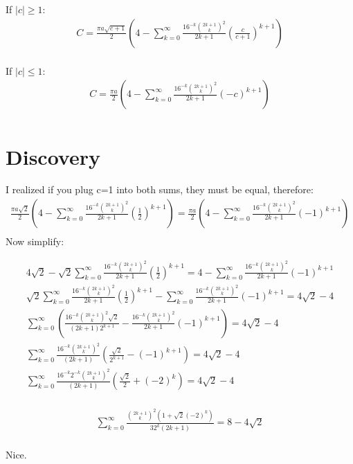 \documentclass{article}
\begin{document}
If $|c| \geq 1$:
\begin{equation*}
\begin{split}
	C = \frac{\pi a\sqrt{c+1}}{2} \left(4 -
	\sum_{k=0}^{\infty} \frac{16^{-k}{{2k+1}\choose k}^2}{2k+1}\left(\frac{c}{c+1}\right)^{k+1}\right)\\
\end{split}
\end{equation*}

If $|c| \leq 1$:
\begin{equation*}
\begin{split}
	C = \frac{\pi a}{2}\left(4-\sum_{k=0}^{\infty}\frac{16^{-k}{{2k+1}\choose k}^2}{2k+1}(-c)^{k+1}\right)\\
\end{split}
\end{equation*}

\section{Discovery}
I realized if you plug c=1 into both sums, they must be equal, therefore:
\begin{equation*}
\begin{split}
	\frac{\pi a\sqrt{2}}{2} \left(4 -
	\sum_{k=0}^{\infty} \frac{16^{-k}{{2k+1}\choose k}^2}{2k+1}\left(\frac{1}{2}\right)^{k+1}\right)
	= \frac{\pi a}{2}\left(4-\sum_{k=0}^{\infty}\frac{16^{-k}{{2k+1}\choose k}^2}{2k+1}(-1)^{k+1}\right)\\
\end{split}
\end{equation*}
Now simplify:

\begin{equation*}
\begin{split}
	4\sqrt2 -
	\sqrt2\sum_{k=0}^{\infty} \frac{16^{-k}{{2k+1}\choose k}^2}{2k+1}\left(\frac{1}{2}\right)^{k+1}
	= 4-\sum_{k=0}^{\infty}\frac{16^{-k}{{2k+1}\choose k}^2}{2k+1}(-1)^{k+1}\\
	\sqrt2\sum_{k=0}^{\infty} \frac{16^{-k}{{2k+1}\choose k}^2}{2k+1}\left(\frac{1}{2}\right)^{k+1}
	-\sum_{k=0}^{\infty}\frac{16^{-k}{{2k+1}\choose k}^2}{2k+1}(-1)^{k+1}
	= 4\sqrt2 - 4\\
	\sum_{k=0}^{\infty} \left( \frac{16^{-k}{{2k+1}\choose k}^2\sqrt2}{(2k+1)2^{k+1}}
	- \frac{16^{-k}{{2k+1}\choose k}^2}{2k+1}(-1)^{k+1} \right)
	= 4\sqrt2 - 4\\
	\sum_{k=0}^{\infty} \frac{16^{-k}{{2k+1}\choose k}^2}{(2k+1)} \left( \frac{\sqrt2}{2^{k+1}} - (-1)^{k+1} \right)
	= 4\sqrt2 - 4\\
	\sum_{k=0}^{\infty} \frac{16^{-k}2^{-k}{{2k+1}\choose k}^2}{(2k+1)} \left( \frac{\sqrt2}{2} + (-2)^k \right)
	= 4\sqrt2 - 4\\
\end{split}
\end{equation*}

\begin{tcolorbox}
\begin{equation*}
\begin{split}
	\sum_{k=0}^{\infty} \frac{{{2k+1}\choose k}^2\left( 1 + \sqrt2(-2)^k \right)}{32^k(2k+1)} 
	= 8 - 4\sqrt2\\
\end{split}
\end{equation*}
\end{tcolorbox}
Nice.
\end{document}
